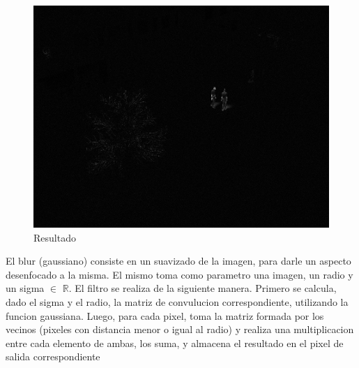 \begin{figure}[H]
\begin{center}

  \includegraphics[width=\linewidth]{img/scene0.png}
  \caption{{\small Resultado}} \label{c}
\endminipage

\end{center}
\end{figure}

El blur (gaussiano) consiste en un suavizado de la imagen, para darle un aspecto desenfocado a la misma. El mismo toma como parametro una imagen, un radio y un sigma $\in$ $\mathbb{R}$. El filtro se realiza de la siguiente manera. Primero se calcula, dado el sigma y el radio, la matriz de convulucion correspondiente, utilizando la funcion gaussiana. Luego, para cada pixel, toma la matriz formada por los vecinos (pixeles con distancia menor o igual al radio) y realiza una multiplicacion entre cada elemento de ambas, los suma, y almacena el resultado en el pixel de salida correspondiente \\

